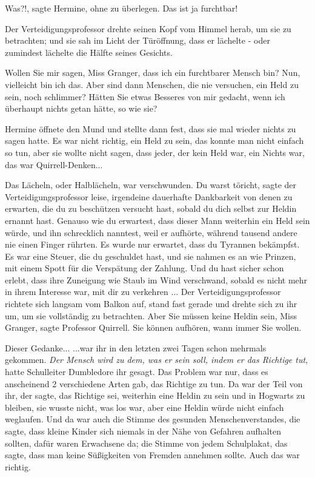 \glqq Was?!\grqq{}, sagte Hermine, ohne zu überlegen. \glqq Das ist ja
furchtbar!\grqq{}

Der Verteidigungsprofessor drehte seinen Kopf vom Himmel herab, um sie zu
betrachten; und sie sah im Licht der Türöffnung, dass er lächelte - oder
zumindest lächelte die Hälfte seines Gesichts.

\glqq Wollen Sie mir sagen, Miss Granger, dass ich ein furchtbarer Mensch bin?
Nun, vielleicht bin ich das. Aber sind dann Menschen, die nie versuchen, ein
Held zu sein, noch schlimmer? Hätten Sie etwas Besseres von mir gedacht, wenn
ich überhaupt nichts getan hätte, so wie sie?\grqq{}

Hermine öffnete den Mund und stellte dann fest, dass sie mal wieder nichts zu
sagen hatte. Es war nicht richtig, ein Held zu sein, das konnte man nicht
einfach so tun, aber sie wollte nicht sagen, dass jeder, der kein Held war, ein
Nichts war, das war Quirrell-Denken...

Das Lächeln, oder Halblächeln, war verschwunden. \glqq Du warst töricht\grqq{},
sagte der Verteidigungsprofessor leise, \glqq irgendeine dauerhafte Dankbarkeit
von denen zu erwarten, die du zu beschützen versucht hast, sobald du dich selbst
zur Heldin ernannt hast. Genauso wie du erwartest, dass dieser Mann weiterhin
ein Held sein würde, und ihn schrecklich nanntest, weil er aufhörte, während
tausend andere nie einen Finger rührten. Es wurde nur erwartet, dass du Tyrannen
bekämpfst. Es war eine Steuer, die du geschuldet hast, und sie nahmen es an wie
Prinzen, mit einem Spott für die Verspätung der Zahlung. Und du hast sicher
schon erlebt, dass ihre Zuneigung wie Staub im Wind verschwand, sobald es nicht
mehr in ihrem Interesse war, mit dir zu verkehren ...\grqq{} Der
Verteidigungsprofessor richtete sich langsam vom Balkon auf, stand fast gerade
und drehte sich zu ihr um, um sie vollständig zu betrachten. \glqq Aber Sie
müssen keine Heldin sein, Miss Granger\grqq{}, sagte Professor Quirrell. \glqq
Sie können aufhören, wann immer Sie wollen.\grqq{}

Dieser Gedanke... ...war ihr in den letzten zwei Tagen schon mehrmals gekommen.
\emph{Der Mensch wird zu dem, was er sein soll, indem er das Richtige tut},
hatte Schulleiter Dumbledore ihr gesagt. Das Problem war nur, dass es
anscheinend 2 verschiedene Arten gab, das Richtige zu tun. Da war der Teil von
ihr, der sagte, das Richtige sei, weiterhin eine Heldin zu sein und in Hogwarts
zu bleiben, sie wusste nicht, was los war, aber eine Heldin würde nicht einfach
weglaufen. Und da war auch die Stimme des gesunden Menschenverstandes, die
sagte, dass kleine Kinder sich niemals in der Nähe von Gefahren aufhalten
sollten, dafür waren Erwachsene da; die Stimme von jedem Schulplakat, das sagte,
dass man keine Süßigkeiten von Fremden annehmen sollte. Auch das war richtig.

